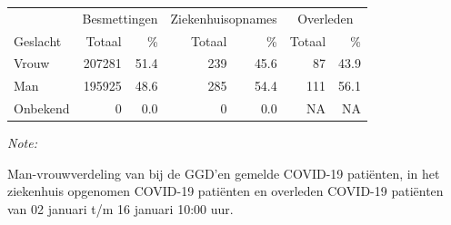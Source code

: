 \documentclass[
  english,
  man,floatsintext]{apa6}
\begin{document}
\begin{table}
\centering\begingroup\fontsize{11}{13}\selectfont

\begin{threeparttable}
\begin{tabular}{lrrrrrr}
\toprule
\multicolumn{1}{c}{ } & \multicolumn{2}{c}{Besmettingen} & \multicolumn{2}{c}{Ziekenhuisopnames} & \multicolumn{2}{c}{Overleden} \\
\cmidrule(l{3pt}r{3pt}){2-3} \cmidrule(l{3pt}r{3pt}){4-5} \cmidrule(l{3pt}r{3pt}){6-7}
Geslacht & Totaal & \% & Totaal & \% & Totaal & \%\\
\midrule
Vrouw & 207281 & 51.4 & 239 & 45.6 & 87 & 43.9\\
Man & 195925 & 48.6 & 285 & 54.4 & 111 & 56.1\\
Onbekend & 0 & 0.0 & 0 & 0.0 & NA & NA\\
\bottomrule
\end{tabular}
\begin{tablenotes}
\item \textit{Note: } 
\item Man-vrouwverdeling van bij de GGD’en gemelde COVID-19 patiënten, in het ziekenhuis opgenomen COVID-19 patiënten en overleden COVID-19 patiënten van 02 januari t/m 16 januari 10:00 uur.
\end{tablenotes}
\end{threeparttable}
\endgroup{}
\end{table}
\newpage
\end{document}
